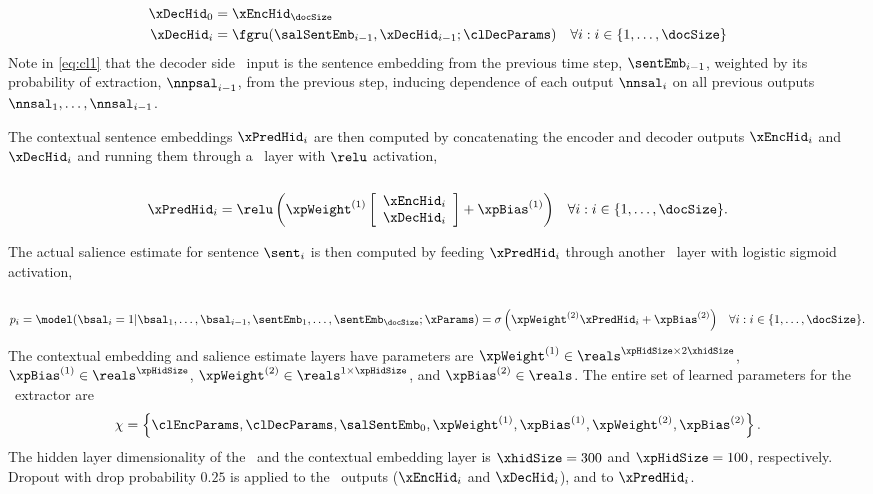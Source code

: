 \noindent{}\\[-40pt]
\begin{align}
    \xDecHid_0  &= \xEncHid_\docSize  \\
   \xDecHid_i &= \fgru(\salSentEmb_{i-1}, \xDecHid_{i-1};\clDecParams)
   &  
    \forall i : i \in \{1,\ldots,\docSize\}  \label{eq:cl1} 
\end{align}
Note in \autoref{eq:cl1} that the decoder side \gru~input is the sentence
embedding from the previous time step, $\sentEmb_{i-1}$, weighted by its
probability of extraction, $\nnpsal_{i-1}$, from the previous step, inducing
dependence of each output $\nnsal_i$ on all previous outputs
$\nnsal_1,\ldots,\nnsal_{i-1}$.

The contextual sentence embeddings $\xPredHid_i$ are then computed by
concatenating the encoder and decoder outputs $\xEncHid_i$ and $\xDecHid_i$ and
running them through a \feedforward~layer with $\relu$ activation,\\

\noindent{}\\[-30pt]
\begin{align}
\xPredHid_i &= \relu\left(\xpWeight^{(1)} \left[\begin{array}{c}\xEncHid_i \\ \xDecHid_i \end{array}\right] + \xpBias^{(1)} \right) & 
    \forall i : i \in \{1,\ldots,\docSize\}.
\end{align}

The actual salience estimate for sentence $\sent_i$ is then computed by feeding
$\xPredHid_i$ through another \feedforward~layer with logistic sigmoid
activation,\\

\noindent{}\\[-40pt]
\begin{align}
 p_i = \model(\bsal_i =1|\bsal_1,\ldots,\bsal_{i-1}, \sentEmb_1,\ldots,\sentEmb_\docSize; \xParams) &= \sigma\left(\xpWeight^{(2)}\xPredHid_i + \xpBias^{(2)}  \right) & 
    \forall i : i \in \{1,\ldots,\docSize\}. 
\end{align}

The contextual embedding and salience estimate layers have parameters are
$\xpWeight^{(1)} \in \reals^{\xpHidSize \times 2 \xhidSize}$, $\xpBias^{(1)}
\in \reals^{\xpHidSize}$, $\xpWeight^{(2)} \in \reals^{1 \times \xpHidSize}$,
and $\xpBias^{(2)}\in \reals$.  The entire set of learned parameters for the
\clext~extractor are
\[
    \chi = \left\{ 
    \clEncParams, \clDecParams,
    \salSentEmb_0,
    \xpWeight^{(1)}, \xpBias^{(1)}, \xpWeight^{(2)}, \xpBias^{(2)}\right\}.
\]
The hidden layer dimensionality of the \gru~and the contextual embedding layer
is $\xhidSize = 300$ and $\xpHidSize=100$, respectively.  Dropout with drop
probability $0.25$ is applied to the \gru~outputs ($\xEncHid_i$ and
$\xDecHid_i$),   and to $\xPredHid_i$.

